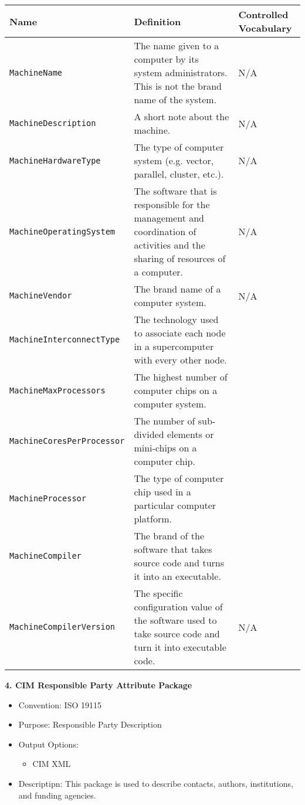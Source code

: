 \begin{tabular}{|p{8cm}|p{20cm}|p{10cm}|}
     {\bf Name} & {\bf Definition} & {\bf Controlled Vocabulary} \\
     \hline\hline
     {\tt MachineName} & The name given to a computer by its system administrators. This is not the brand name of the system.& N/A \\
     {\tt MachineDescription} & A short note about the machine. & N/A \\
     {\tt MachineHardwareType} & The type of computer system (e.g. vector, parallel, cluster, etc.).& N/A \\
     {\tt MachineOperatingSystem} & The software that is responsible for the management and coordination of activities and the sharing of resources of a computer. & N/A\\
     {\tt MachineVendor} & The brand name of a computer system. & N/A \\
     {\tt MachineInterconnectType} & The technology used to associate each node in a supercomputer with every other node. & \\
     {\tt MachineMaxProcessors} & The highest number of computer chips on a computer system. & \\
     {\tt MachineCoresPerProcessor} & The number of sub-divided elements or mini-chips on a computer chip. &  \\
     {\tt MachineProcessor} & The type of computer chip used in a particular computer platform. & \\
     {\tt MachineCompiler} & The brand of the software that takes source code and turns it into an executable.& \\
     {\tt MachineCompilerVersion} & The specific configuration value of the software used to take source code and turn it into executable code. & N/A \\
\end{tabular}


\vspace{.25in}

{\bf 4. CIM Responsible Party Attribute Package}

\begin{itemize}
    \item Convention: ISO 19115
    \item Purpose: Responsible Party Description
    \item Output Options: 
    \begin{itemize}
        \item CIM XML 
    \end{itemize} 
    \item Descriptipn: This package is used to describe contacts, authors, institutions, and funding agencies. 
\end{itemize}


